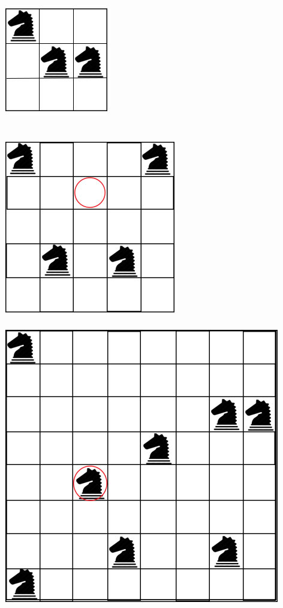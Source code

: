 \documentclass[10pt,a4paper]{article}
\begin{document}
\begin{multicols}{2}
\includegraphics[scale=0.20]{img/knight3x3_2.jpg}\\\\\\

\includegraphics[scale=0.20]{img/knight5x5.jpg}\\\\

\includegraphics[scale=0.20]{img/knight8x8.jpg}
\end{multicols}
\end{document}
